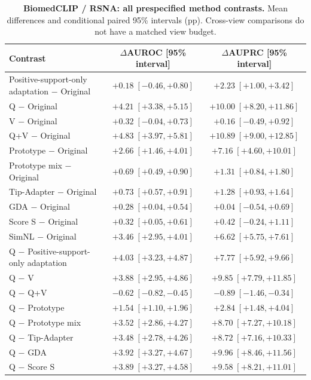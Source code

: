 \begin{table}[tp]
\centering
\caption{\textbf{BiomedCLIP / RSNA: all prespecified method contrasts.} Mean differences and conditional paired 95\% intervals (pp). Cross-view comparisons do not have a matched view budget.}
\label{tab:supp-oldci-biomedclip-rsna_pneumonia}
\footnotesize
\setlength{\tabcolsep}{4pt}
\begin{tabular*}{\textwidth}{@{\extracolsep{\fill}}lcc@{}}
\toprule
Contrast & $\Delta$AUROC [95\% interval] & $\Delta$AUPRC [95\% interval] \\
\midrule
Positive-support-only adaptation $-$ Original & $+0.18\;[-0.46,+0.80]$ & $+2.23\;[+1.00,+3.42]$ \\
Q $-$ Original & $+4.21\;[+3.38,+5.15]$ & $+10.00\;[+8.20,+11.86]$ \\
V $-$ Original & $+0.32\;[-0.04,+0.73]$ & $+0.16\;[-0.49,+0.92]$ \\
Q+V $-$ Original & $+4.83\;[+3.97,+5.81]$ & $+10.89\;[+9.00,+12.85]$ \\
Prototype $-$ Original & $+2.66\;[+1.46,+4.01]$ & $+7.16\;[+4.60,+10.01]$ \\
Prototype mix $-$ Original & $+0.69\;[+0.49,+0.90]$ & $+1.31\;[+0.84,+1.80]$ \\
Tip-Adapter $-$ Original & $+0.73\;[+0.57,+0.91]$ & $+1.28\;[+0.93,+1.64]$ \\
GDA $-$ Original & $+0.28\;[+0.04,+0.54]$ & $+0.04\;[-0.54,+0.69]$ \\
Score S $-$ Original & $+0.32\;[+0.05,+0.61]$ & $+0.42\;[-0.24,+1.11]$ \\
SimNL $-$ Original & $+3.46\;[+2.95,+4.01]$ & $+6.62\;[+5.75,+7.61]$ \\
Q $-$ Positive-support-only adaptation & $+4.03\;[+3.23,+4.87]$ & $+7.77\;[+5.92,+9.66]$ \\
Q $-$ V & $+3.88\;[+2.95,+4.86]$ & $+9.85\;[+7.79,+11.85]$ \\
Q $-$ Q+V & $-0.62\;[-0.82,-0.45]$ & $-0.89\;[-1.46,-0.34]$ \\
Q $-$ Prototype & $+1.54\;[+1.10,+1.96]$ & $+2.84\;[+1.48,+4.04]$ \\
Q $-$ Prototype mix & $+3.52\;[+2.86,+4.27]$ & $+8.70\;[+7.27,+10.18]$ \\
Q $-$ Tip-Adapter & $+3.48\;[+2.78,+4.26]$ & $+8.72\;[+7.16,+10.33]$ \\
Q $-$ GDA & $+3.92\;[+3.27,+4.67]$ & $+9.96\;[+8.46,+11.56]$ \\
Q $-$ Score S & $+3.89\;[+3.27,+4.58]$ & $+9.58\;[+8.21,+11.01]$ \\

\end{tabular*}
\end{table}

